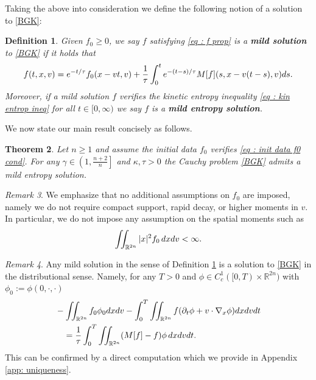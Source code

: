 \documentclass{amsart}
\theoremstyle{plain}
\newtheorem{theorem}{Theorem}[section]
\newtheorem{definition}[theorem]{Definition}
\theoremstyle{remark}
\newtheorem{remark}[theorem]{Remark}
\numberwithin{equation}{section}
\newcommand{\p}{\partial}
\newcommand{\R}{\mathbb{R}}
\newcommand{\dx}{\textnormal{d}x}
\newcommand{\dv}{\textnormal{d}v}
\newcommand{\dt}{\textnormal{d}t}
\newcommand{\ds}{\textnormal{d}s}
\begin{document}
Taking the above into consideration we define the following notion of a solution to \eqref{BGK}:
\begin{definition}
\label{def:mild}
Given $f_0\ge 0$, we say $f$ satisfying \eqref{eq : f prop} is a \textbf{mild solution} to \eqref{BGK} if it holds that
    \begin{align}
    \label{defeq : mild}
    f(t,x,v) = e^{-t/\tau} f_0(x-vt,v) + \frac{1}{\tau}\int_0^t e^{-(t-s)/\tau} M[f](s,x-v(t-s),v) \ds. 
    \end{align}    
    Moreover, if a mild solution $f$ verifies the kinetic entropy inequality \eqref{eq : kin entrop ineq} for all $t\in [0,\infty)$ we say $f$ is a \textbf{mild entropy solution}.
\end{definition}
We now state our main result concisely as follows.

\begin{theorem}
\label{thm : main theorem 1}
Let $n\ge 1$ and assume the initial data $f_0$ verifies \eqref{eq : init data f0 cond}. For any $\gamma \in \left(1,\frac{n+2}{n}\right]$ and $\kappa,\tau>0$ the Cauchy problem \eqref{BGK} admits a mild entropy solution.
\end{theorem}

\begin{remark}
    We emphasize that no additional assumptions on $f_0$ are imposed, namely we do not require compact support, rapid decay, or higher moments in $v$. In particular, we do not impose any assumption on the spatial moments such as
    \begin{align*}
        \iint_{\R^{2n}} |x|^2 f_0 \, \dx \dv < \infty.
    \end{align*}
\end{remark}

\begin{remark} \label{rem: weak}
    Any mild solution in the sense of Definition \ref{def:mild} is a solution to \eqref{BGK} in the distributional sense. Namely, for any $T>0$ and $\phi\in C^1_c([0,T)\times \R^{2n})$ with $\phi_0:= \phi(0,\cdot,\cdot)$
    \begin{align*}
        &-\iint_{\R^{2n}} f_0 \phi_0 \dx\dv - \int_0^T \iint_{\R^{2n}} f(\p_t\phi + v\cdot \nabla_x\phi)\dx\dv\dt\\
        &\quad = \frac{1}{\tau}\int_0^T \iint_{\R^{2n}}(M[f]-f)\phi\, \dx \dv \dt.
    \end{align*}
    This can be confirmed by a direct computation which we provide in Appendix \ref{app: uniqueness}.
\end{remark}
\end{document}
